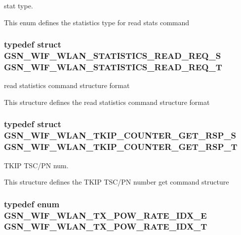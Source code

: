 stat type. 

This enum defines the statistics type for read stats command \hypertarget{a00677_ga0532c6cda31388631d8d6346390ac764}{
\subsubsection[{GSN\_\-WIF\_\-WLAN\_\-STATISTICS\_\-READ\_\-REQ\_\-T}]{\setlength{\rightskip}{0pt plus 5cm}typedef struct {\bf GSN\_\-WIF\_\-WLAN\_\-STATISTICS\_\-READ\_\-REQ\_\-S} {\bf GSN\_\-WIF\_\-WLAN\_\-STATISTICS\_\-READ\_\-REQ\_\-T}}}
\label{a00677_ga0532c6cda31388631d8d6346390ac764}


read statistics command structure format 

This structure defines the read statistics command structure format \hypertarget{a00677_ga4c920262f319d5fe619f45ee687d827b}{
\subsubsection[{GSN\_\-WIF\_\-WLAN\_\-TKIP\_\-COUNTER\_\-GET\_\-RSP\_\-T}]{\setlength{\rightskip}{0pt plus 5cm}typedef struct {\bf GSN\_\-WIF\_\-WLAN\_\-TKIP\_\-COUNTER\_\-GET\_\-RSP\_\-S}  {\bf GSN\_\-WIF\_\-WLAN\_\-TKIP\_\-COUNTER\_\-GET\_\-RSP\_\-T}}}
\label{a00677_ga4c920262f319d5fe619f45ee687d827b}


TKIP TSC/PN num. 

This structure defines the TKIP TSC/PN number get command structure \hypertarget{a00677_gaa864eedc8e384ed0ea49b62f267aff72}{
\subsubsection[{GSN\_\-WIF\_\-WLAN\_\-TX\_\-POW\_\-RATE\_\-IDX\_\-T}]{\setlength{\rightskip}{0pt plus 5cm}typedef enum {\bf GSN\_\-WIF\_\-WLAN\_\-TX\_\-POW\_\-RATE\_\-IDX\_\-E} {\bf GSN\_\-WIF\_\-WLAN\_\-TX\_\-POW\_\-RATE\_\-IDX\_\-T}}}
\label{a00677_gaa864eedc8e384ed0ea49b62f267aff72}


